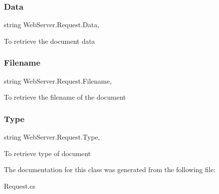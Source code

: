 \subsubsection{\texorpdfstring{Data}{Data}}
{\footnotesize\ttfamily string Web\+Server.\+Request.\+Data\hspace{0.3cm}{\ttfamily [get]}, {\ttfamily [set]}}



To retrieve the document data 

\mbox{\label{class_web_server_1_1_request_a1797bd8f10a7b7131cf7b90df7a250af}} 
\subsubsection{\texorpdfstring{Filename}{Filename}}
{\footnotesize\ttfamily string Web\+Server.\+Request.\+Filename\hspace{0.3cm}{\ttfamily [get]}, {\ttfamily [set]}}



To retrieve the filename of the document 

\mbox{\label{class_web_server_1_1_request_a97f8cec3d26773cdc2d227817be59bfe}} 
\subsubsection{\texorpdfstring{Type}{Type}}
{\footnotesize\ttfamily string Web\+Server.\+Request.\+Type\hspace{0.3cm}{\ttfamily [get]}, {\ttfamily [set]}}



To retrieve type of document 



The documentation for this class was generated from the following file\+:\begin{DoxyCompactItemize}
\item 
Request.\+cs\end{DoxyCompactItemize}
